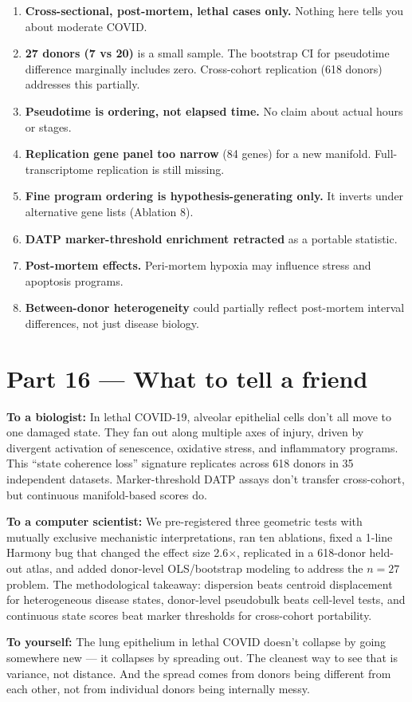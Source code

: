 \documentclass[11pt]{article}
\begin{document}
\begin{enumerate}
\item \textbf{Cross-sectional, post-mortem, lethal cases only.} Nothing here tells you about moderate COVID.
\item \textbf{27 donors (7 vs 20)} is a small sample. The bootstrap CI for pseudotime difference marginally includes zero. Cross-cohort replication (618 donors) addresses this partially.
\item \textbf{Pseudotime is ordering, not elapsed time.} No claim about actual hours or stages.
\item \textbf{Replication gene panel too narrow} (84 genes) for a new manifold. Full-transcriptome replication is still missing.
\item \textbf{Fine program ordering is hypothesis-generating only.} It inverts under alternative gene lists (Ablation 8).
\item \textbf{DATP marker-threshold enrichment retracted} as a portable statistic.
\item \textbf{Post-mortem effects.} Peri-mortem hypoxia may influence stress and apoptosis programs.
\item \textbf{Between-donor heterogeneity} could partially reflect post-mortem interval differences, not just disease biology.
\end{enumerate}


\section{Part 16 --- What to tell a friend}

\textbf{To a biologist:} In lethal COVID-19, alveolar epithelial cells don't all move to one damaged state. They fan out along multiple axes of injury, driven by divergent activation of senescence, oxidative stress, and inflammatory programs. This ``state coherence loss'' signature replicates across 618 donors in 35 independent datasets. Marker-threshold DATP assays don't transfer cross-cohort, but continuous manifold-based scores do.

\textbf{To a computer scientist:} We pre-registered three geometric tests with mutually exclusive mechanistic interpretations, ran ten ablations, fixed a 1-line Harmony bug that changed the effect size 2.6$\times$, replicated in a 618-donor held-out atlas, and added donor-level OLS/bootstrap modeling to address the $n = 27$ problem. The methodological takeaway: dispersion beats centroid displacement for heterogeneous disease states, donor-level pseudobulk beats cell-level tests, and continuous state scores beat marker thresholds for cross-cohort portability.

\textbf{To yourself:} The lung epithelium in lethal COVID doesn't collapse by going somewhere new --- it collapses by spreading out. The cleanest way to see that is variance, not distance. And the spread comes from donors being different from each other, not from individual donors being internally messy.
\end{document}
